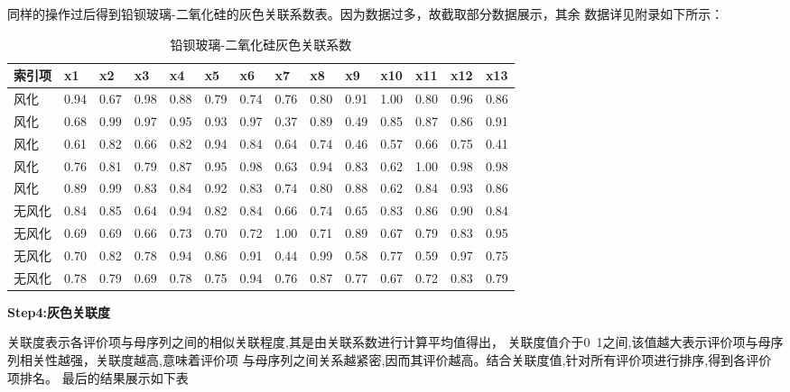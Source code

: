 \documentclass[UTF8]{ctexart}
\begin{document}
同样的操作过后得到铅钡玻璃-二氧化硅的灰色关联系数表。因为数据过多，故截取部分数据展示，其余
数据详见附录如下所示：
\begin{table}[!ht]
    \centering
    \caption{铅钡玻璃-二氧化硅灰色关联系数}
    \begin{tabular}{|l|l|l|l|l|l|l|l|l|l|l|l|l|l|}
    \hline
        索引项 & x1 & x2 & x3 & x4 & x5 & x6 & x7 & x8 & x9 & x10 & x11 & x12 & x13 \\ \hline
        风化 & 0.94  & 0.67  & 0.98  & 0.88  & 0.79  & 0.74  & 0.76  & 0.80  & 0.91  & 1.00  & 0.80  & 0.96  & 0.86  \\ \hline
        风化 & 0.68  & 0.99  & 0.97  & 0.95  & 0.93  & 0.97  & 0.37  & 0.89  & 0.49  & 0.85  & 0.87  & 0.86  & 0.91  \\ \hline
        风化 & 0.61  & 0.82  & 0.66  & 0.82  & 0.94  & 0.84  & 0.64  & 0.74  & 0.46  & 0.57  & 0.66  & 0.75  & 0.41  \\ \hline
        风化 & 0.76  & 0.81  & 0.79  & 0.87  & 0.95  & 0.98  & 0.63  & 0.94  & 0.83  & 0.62  & 1.00  & 0.98  & 0.98  \\ \hline
        风化 & 0.89  & 0.99  & 0.83  & 0.84  & 0.92  & 0.83  & 0.74  & 0.80  & 0.88  & 0.62  & 0.84  & 0.93  & 0.86  \\ \hline
        无风化 & 0.84  & 0.85  & 0.64  & 0.94  & 0.82  & 0.84  & 0.66  & 0.74  & 0.65  & 0.83  & 0.86  & 0.90  & 0.84  \\ \hline
        无风化 & 0.69  & 0.69  & 0.66  & 0.73  & 0.70  & 0.72  & 1.00  & 0.71  & 0.89  & 0.67  & 0.79  & 0.83  & 0.95  \\ \hline
        无风化 & 0.70  & 0.82  & 0.78  & 0.94  & 0.86  & 0.91  & 0.44  & 0.99  & 0.58  & 0.77  & 0.59  & 0.97  & 0.75  \\ \hline
        无风化 & 0.78  & 0.79  & 0.69  & 0.78  & 0.75  & 0.94  & 0.76  & 0.87  & 0.77  & 0.67  & 0.72  & 0.83  & 0.79  \\ \hline
    \end{tabular}
\end{table}

\textbf{Step4:灰色关联度}

关联度表示各评价项与母序列之间的相似关联程度,其是由关联系数进行计算平均值得出，
关联度值介于0~1之间,该值越大表示评价项与母序列相关性越强，关联度越高,意味着评价项
与母序列之间关系越紧密,因而其评价越高。结合关联度值,针对所有评价项进行排序,得到各评价项排名。
最后的结果展示如下表
\end{document}
